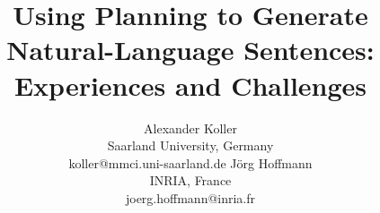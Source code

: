 \documentclass[letterpaper]{article}
\begin{document}
\title{Using Planning to Generate Natural-Language Sentences:\\
  Experiences and Challenges}

\author{
Alexander Koller \\ Saarland University, Germany \\ koller@mmci.uni-saarland.de
\And
J\"org Hoffmann \\ INRIA, France \\ joerg.hoffmann@inria.fr
}


\maketitle












\end{document}

